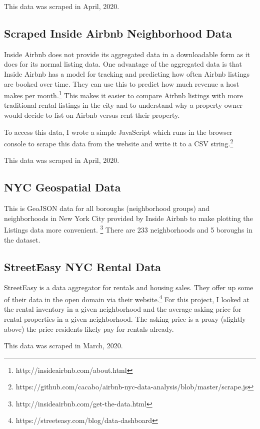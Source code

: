 \documentclass[12pt]{article}
\begin{document}
This data was scraped in April, 2020.

\subsection{Scraped Inside Airbnb Neighborhood Data}

Inside Airbnb does not provide its aggregated data in a downloadable form as it does for its normal listing data. One advantage of the aggregated data is that Inside Airbnb has a model for tracking and predicting how often Airbnb listings are booked over time. They can use this to predict how much revenue a host makes per month.\footnote{http://insideairbnb.com/about.html} This makes it easier to compare Airbnb listings with more traditional rental listings in the city and to understand why a property owner would decide to list on Airbnb versus rent their property.

To access this data, I wrote a simple JavaScript which runs in the browser console to scrape this data from the website and write it to a CSV string.\footnote{https://github.com/cacabo/airbnb-nyc-data-analysis/blob/master/scrape.js}

This data was scraped in April, 2020.

\subsection{NYC Geospatial Data}

This is GeoJSON data for all boroughs (neighborhood groups) and neighborhoods in New York City provided by Inside Airbnb to make plotting the Listings data more convenient.
\footnote{http://insideairbnb.com/get-the-data.html} There are 233 neighborhoods and 5 boroughs in the dataset.

\subsection{StreetEasy NYC Rental Data}

StreetEasy is a data aggregator for rentals and housing sales. They offer up some of their data in the open domain via their website.\footnote{https://streeteasy.com/blog/data-dashboard} For this project, I looked at the rental inventory in a given neighborhood and the average asking price for rental properties in a given neighborhood. The asking price is a proxy (slightly above) the price residents likely pay for rentals already.

This data was scraped in March, 2020.
\end{document}
